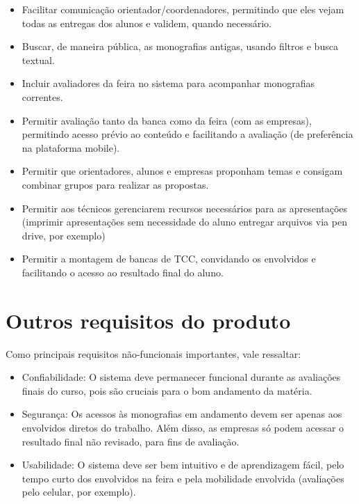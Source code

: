 \begin{itemize}
    \item Facilitar comunicação orientador/coordenadores, permitindo que eles vejam todas as entregas dos alunos e validem, quando necessário.
    \item Buscar, de maneira pública, as monografias antigas, usando filtros e busca textual.
    \item Incluir avaliadores da feira no sistema para acompanhar monografias correntes.
    \item Permitir avaliação tanto da banca como da feira (com as empresas), permitindo acesso prévio ao conteúdo e facilitando a avaliação (de preferência na plataforma mobile).
    \item Permitir que orientadores, alunos e empresas proponham temas e consigam combinar grupos para realizar as propostas.
    \item Permitir aos técnicos gerenciarem recursos necessários para as apresentações (imprimir apresentações sem necessidade do aluno entregar arquivos via pen drive, por exemplo)
    \item Permitir a montagem de bancas de TCC, convidando os envolvidos e facilitando o acesso ao resultado final do aluno.
\end{itemize}
  
\section{Outros requisitos do produto}
Como principais requisitos não-funcionais importantes, vale ressaltar:

\begin{itemize}
    \item Confiabilidade: O sistema deve permanecer funcional durante as avaliações finais do curso, pois são cruciais para o bom andamento da matéria.
    \item Segurança: Os acessos às monografias em andamento devem ser apenas aos envolvidos diretos do trabalho. Além disso, as empresas só podem acessar o resultado final não revisado, para fins de avaliação.
    \item Usabilidade: O sistema deve ser bem intuitivo e de aprendizagem fácil, pelo tempo curto dos envolvidos na feira e pela mobilidade envolvida (avaliações pelo celular, por exemplo).
\end{itemize}
